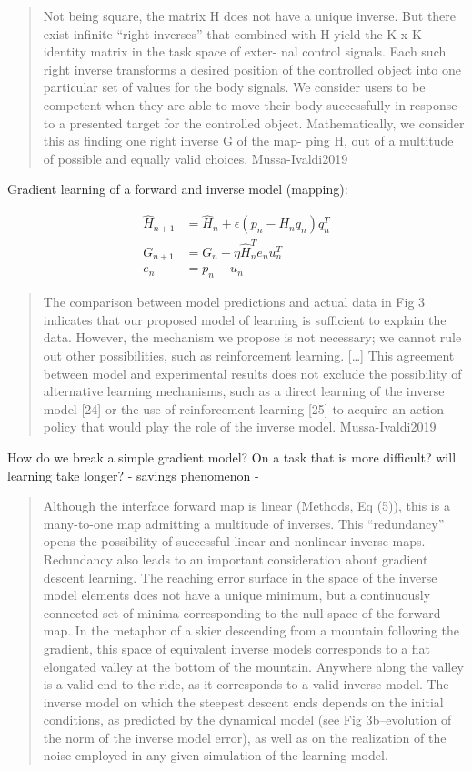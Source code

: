 \documentclass[../main.tex]{subfiles}
\begin{document}
\begin{quote}
Not being square, the matrix H does not have a unique inverse. But there exist infinite ``right inverses'' that combined with H yield the K x K identity matrix in the task space of exter- nal control signals. Each such right inverse transforms a desired position of the controlled object into one particular set of values for the body signals. We consider users to be competent when they are able to move their body successfully in response to a presented target for the controlled object. Mathematically, we consider this as finding one right inverse G of the map- ping H, out of a multitude of possible and equally valid choices. Mussa-Ivaldi2019
\end{quote}

Gradient learning of a forward and inverse model (mapping):

\begin{align*}
    \hat{H}_{n+1} &= \hat{H}_n + \epsilon(p_n - H_nq_n)q_n^T  \\
    G_{n+1} &= G_n - \eta\hat{H}_n^Te_nu_n^T \\
    e_n &= p_n - u_n
\end{align*}

\begin{quote}
The comparison between model predictions and actual data in Fig 3 indicates that our proposed model of learning is sufficient to explain the data. However, the mechanism we propose is not necessary; we cannot rule out other possibilities, such as reinforcement learning. {[}\ldots{]} This agreement between model and experimental results does not exclude the possibility of alternative learning mechanisms, such as a direct learning of the inverse model {[}24{]} or the use of reinforcement learning {[}25{]} to acquire an action policy that would play the role of the inverse model. Mussa-Ivaldi2019
\end{quote}

How do we break a simple gradient model? On a task that is more difficult? will learning take longer? - savings phenomenon -

\begin{quote}
Although the interface forward map is linear (Methods, Eq (5)), this is a many-to-one map admitting a multitude of inverses. This ``redundancy'' opens the possibility of successful linear and nonlinear inverse maps. Redundancy also leads to an important consideration about gradient descent learning. The reaching error surface in the space of the inverse model elements does not have a unique minimum, but a continuously connected set of minima corresponding to the null space of the forward map. In the metaphor of a skier descending from a mountain following the gradient, this space of equivalent inverse models corresponds to a flat elongated valley at the bottom of the mountain. Anywhere along the valley is a valid end to the ride, as it corresponds to a valid inverse model. The inverse model on which the steepest descent ends depends on the initial conditions, as predicted by the dynamical model (see Fig 3b--evolution of the norm of the inverse model error), as well as on the realization of the noise employed in any given simulation of the learning model.
\end{quote}
\end{document}
